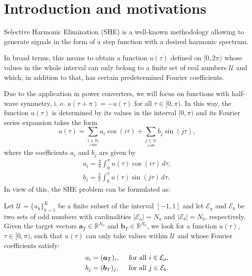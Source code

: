 
\section{Introduction and motivations} 
 
Selective Harmonic Elimination (SHE) \cite{Rodriguez2002} is a well-known methodology allowing to generate signals in the form of a step function with a desired harmonic spectrum. 

In broad terms, this means to obtain a function $u(\tau)$ defined on $[0,2\pi)$ whose values in the whole interval can only belong to a finite set of real numbers $\mathcal{U}$ and which, in addition to that, has certain predetermined Fourier coefficients. 

Due to the application in power converters, we will focus on functions with half-wave symmetry, i. e. $u(\tau + \pi) = -u(\tau)$ for all $\tau \in [0,\pi)$. In this way, the function $u(\tau)$ is determined by its values in the interval $[0,\pi)$ and its Fourier series expansion takes the form
\begin{equation}
    u(\tau ) = \sum_{\underset{i\, odd}{i \in \mathbb{N}}} a_i \cos(i\tau)+ \sum_{\underset{j\, odd}{j \in \mathbb{N}}}  b_j \sin(j \tau), 
\end{equation}
where the coefficients $a_i$ and $b_j$ are given by
\begin{equation} \label{an}
    \begin{aligned}
    a_i = \frac{2}{\pi} \int_0^\pi u(\tau ) \cos(i \tau)\,d\tau, 
    \\
    b_j = \frac{2}{\pi} \int_0^\pi u(\tau)  \sin(j \tau)\,d\tau.
    \end{aligned}
\end{equation}
In view of this, the SHE problem can be formulated as:
\newline
\begin{problem}[SHE]\label{SHEp}
Let $\mathcal{U} = \{u_k\}_{k=1}^K$ be a finite subset of the interval $[-1,1]$ and let $\mathcal{E} _a $ and $\mathcal{E} _b $ be two sets of odd numbers with cardinalities $|\mathcal{E}_a| = N_a $ and $ |\mathcal{E} _b| = N_b$, respectively. Given the target vectors $\bm{a}_T \in \mathbb{R}^{N_a}$ and $\bm{b}_T \in \mathbb{R}^{N_b} $, we look for a function $u(\tau)$, $\tau \in [0,\pi)$, such that $u(\tau)$ can only take values within $\mathcal{U}$ and whose Fourier coefficients satisfy: 
\begin{gather}
	\notag a_i = (\bm{a}_T)_i, \quad\textrm{ for all } i \in \mathcal{E}_a,
	\\
	\notag b_j = (\bm {b}_T)_j, \quad\textrm{ for all } j \in \mathcal{E}_b.
\end{gather}
\end{problem}

